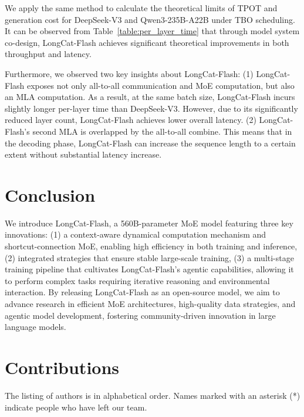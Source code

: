 \documentclass{article}
\newcommand{\longcat}{LongCat-Flash\xspace}
\begin{document}
We apply the same method to calculate the theoretical limits of TPOT and generation cost for DeepSeek-V3 and Qwen3-235B-A22B under TBO scheduling. It can be observed from Table~\ref{table:per_layer_time} that through model system co-design, \longcat achieves significant theoretical improvements in both throughput and latency.


Furthermore, we observed two key insights about \longcat: (1) \longcat exposes not only all-to-all communication and MoE computation, but also an MLA computation. As a result, at the same batch size, \longcat incurs slightly longer per-layer time than DeepSeek-V3. However, due to its significantly reduced layer count, \longcat achieves lower overall latency. (2) \longcat's second MLA is overlapped by the all-to-all combine. This means that in the decoding phase, \longcat can increase the sequence length to a certain extent without substantial latency increase.


\section{Conclusion}


We introduce \longcat, a 560B-parameter MoE model featuring three key innovations: (1) a context-aware dynamical computation mechanism and shortcut-connection MoE, enabling high efficiency in both training and inference, (2) integrated strategies that ensure stable large-scale training, (3) a multi-stage training pipeline that cultivates \longcat's agentic capabilities, allowing it to perform complex tasks requiring iterative reasoning and environmental interaction.
By releasing \longcat as an open-source model, we aim to advance research in efficient MoE architectures, high-quality data strategies, and agentic model development, fostering community-driven innovation in large language models.



\clearpage

\section{Contributions}

The listing of authors is in alphabetical order. Names marked with an asterisk (*) indicate people who have left our team.
\end{document}
